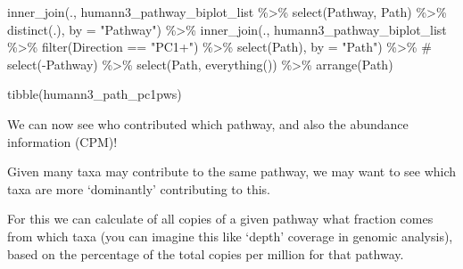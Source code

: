 \documentclass[
  letterpaper,
]{book}
\newenvironment{Shaded}{}{}
\newcommand{\AttributeTok}[1]{\textcolor[rgb]{0.84,0.23,0.29}{#1}}
\newcommand{\CommentTok}[1]{\textcolor[rgb]{0.42,0.45,0.49}{#1}}
\newcommand{\FunctionTok}[1]{\textcolor[rgb]{0.44,0.26,0.76}{#1}}
\newcommand{\NormalTok}[1]{\textcolor[rgb]{0.14,0.16,0.18}{#1}}
\newcommand{\SpecialCharTok}[1]{\textcolor[rgb]{0.00,0.36,0.77}{#1}}
\newcommand{\StringTok}[1]{\textcolor[rgb]{0.01,0.18,0.38}{#1}}
\begin{document}
\begin{Shaded}
\begin{Highlighting}[]
  \FunctionTok{inner\_join}\NormalTok{(., humann3\_pathway\_biplot\_list }\SpecialCharTok{\%\textgreater{}\%}
              \FunctionTok{select}\NormalTok{(Pathway, Path) }\SpecialCharTok{\%\textgreater{}\%}
               \FunctionTok{distinct}\NormalTok{(.), }\AttributeTok{by =} \StringTok{"Pathway"}\NormalTok{) }\SpecialCharTok{\%\textgreater{}\%}
  \FunctionTok{inner\_join}\NormalTok{(.,  humann3\_pathway\_biplot\_list }\SpecialCharTok{\%\textgreater{}\%}
               \FunctionTok{filter}\NormalTok{(Direction }\SpecialCharTok{==} \StringTok{"PC1+"}\NormalTok{) }\SpecialCharTok{\%\textgreater{}\%}
               \FunctionTok{select}\NormalTok{(Path), }\AttributeTok{by =} \StringTok{"Path"}\NormalTok{) }\SpecialCharTok{\%\textgreater{}\%}
  \CommentTok{\# select({-}Pathway) \%\textgreater{}\%}
  \FunctionTok{select}\NormalTok{(Path, }\FunctionTok{everything}\NormalTok{()) }\SpecialCharTok{\%\textgreater{}\%}
  \FunctionTok{arrange}\NormalTok{(Path)}

\FunctionTok{tibble}\NormalTok{(humann3\_path\_pc1pws)}
\end{Highlighting}
\end{Shaded}

We can now see who contributed which pathway, and also the abundance
information (CPM)!

Given many taxa may contribute to the same pathway, we may want to see
which taxa are more `dominantly' contributing to this.

For this we can calculate of all copies of a given pathway what fraction
comes from which taxa (you can imagine this like `depth' coverage in
genomic analysis), based on the percentage of the total copies per
million for that pathway.
\end{document}
